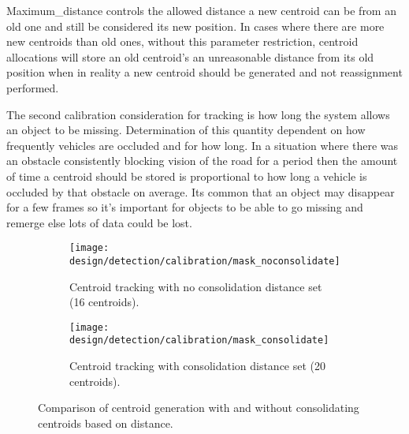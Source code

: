 Maximum\_distance controls the allowed distance a new centroid can be from an old one and still be considered its new position. In cases where there are more new centroids than old ones, without this parameter restriction, centroid allocations will store an old centroid's an unreasonable distance from its old position when in reality a new centroid should be generated and not reassignment performed.

The second calibration consideration for tracking is how long the system allows an object to be missing. Determination of this quantity dependent on how frequently vehicles are occluded and for how long. In a situation where there was an obstacle consistently blocking vision of the road for a period then the amount of time a centroid should be stored is proportional to how long a vehicle is occluded by that obstacle on average. Its common that an object may disappear for a few frames so it's important for objects to be able to go missing and remerge else lots of data could be lost.

\begin{figure}[H]
\centering
\begin{subfigure}[b]{0.45\linewidth}
            \centering\texttt{[image: design/detection/calibration/mask\_noconsolidate]}
            \captionsetup{format=hang}
            \caption{Centroid tracking with no consolidation distance set (16 centroids).}
            \label{fig:consolidateA}
  \label{fig:}
    \end{subfigure}
    \begin{subfigure}[b]{0.45\linewidth}
            \centering\texttt{[image: design/detection/calibration/mask\_consolidate]}
            \captionsetup{format=hang}
        \caption{Centroid tracking with consolidation distance set (20 centroids).}
        \label{fig:consolidateB}
      \end{subfigure}
      \captionsetup{format=hang}
    \caption{Comparison of centroid generation with and without consolidating centroids based on distance.}
    \label{fig:centroids_consolidation}
\end{figure}
  
